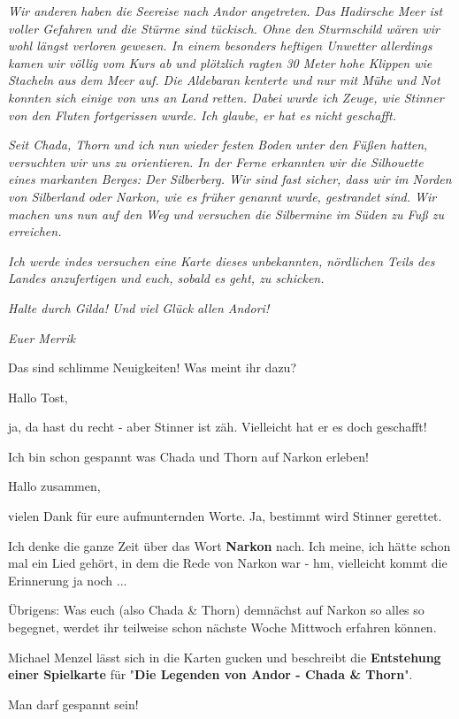 \documentclass[10pt, a4paper, oneside]{book}
\begin{document}
\begin{multicols}{2}
\textit{Wir anderen haben die Seereise nach Andor angetreten. Das Hadirsche Meer ist voller Gefahren und die Stürme sind tückisch. Ohne den Sturmschild wären wir wohl längst verloren gewesen. In einem besonders heftigen Unwetter allerdings kamen wir völlig vom Kurs ab und plötzlich ragten 30 Meter hohe Klippen wie Stacheln aus dem Meer auf. Die Aldebaran kenterte und nur mit Mühe und Not konnten sich einige von uns an Land retten. Dabei wurde ich Zeuge, wie Stinner von den Fluten fortgerissen wurde. Ich glaube, er hat es nicht geschafft.}

\textit{Seit Chada, Thorn und ich nun wieder festen Boden unter den Füßen hatten, versuchten wir uns zu orientieren. In der Ferne erkannten wir die Silhouette eines markanten Berges: Der Silberberg. Wir sind fast sicher, dass wir im Norden von Silberland oder Narkon, wie es früher genannt wurde, gestrandet sind. Wir machen uns nun auf den Weg und versuchen die Silbermine im Süden zu Fuß zu erreichen.}

\textit{Ich werde indes versuchen eine Karte dieses unbekannten, nördlichen Teils des Landes anzufertigen und euch, sobald es geht, zu schicken.}

\textit{Halte durch Gilda! Und viel Glück allen Andori!}

\textit{Euer Merrik}

Das sind schlimme Neuigkeiten! Was meint ihr dazu?

Hallo Tost,

ja, da hast du recht - aber Stinner ist zäh. Vielleicht hat er es doch geschafft!

Ich bin schon gespannt was Chada und Thorn auf Narkon erleben!


Hallo zusammen,

vielen Dank für eure aufmunternden Worte. Ja, bestimmt wird Stinner gerettet.

Ich denke die ganze Zeit über das Wort \textbf{Narkon} nach. Ich meine, ich hätte schon mal ein Lied gehört, in dem die Rede von Narkon war - hm, vielleicht kommt die Erinnerung ja noch ...

Übrigens: Was euch (also Chada \& Thorn) demnächst auf Narkon so alles so begegnet, werdet ihr teilweise schon nächste Woche Mittwoch erfahren können.

Michael Menzel lässt sich in die Karten gucken und beschreibt die \textbf{Entstehung einer Spielkarte} für "\textbf{Die Legenden von Andor - Chada \& Thorn}".


Man darf gespannt sein!


\end{multicols}
\end{document}

